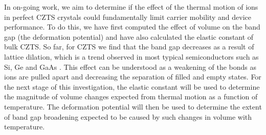In on-going work, we aim to determine if the effect of the thermal motion of ions in perfect CZTS crystals could fundamentally limit carrier mobility and device performance. To do this, we have first computed the effect of volume on the band gap (the deformation potential) and have also calculated the elastic constant of bulk CZTS. So far, for CZTS we find that the band gap decreases as a result of lattice dilation, which is a trend observed in most typical semiconductors such as Si, Ge and GaAs \cite{MAPI_Eg_broadening}. This effect can be understood as a weakening of the bonds as ions are pulled apart and decreasing the separation of filled and empty states. For the next stage of this investigation, the elastic constant will be used to determine the magnitude of volume changes expected from thermal motion as a function of temperature. The deformation potential will then be used to determine the extent of band gap broadening expected to be caused by such changes in volume with temperature.
